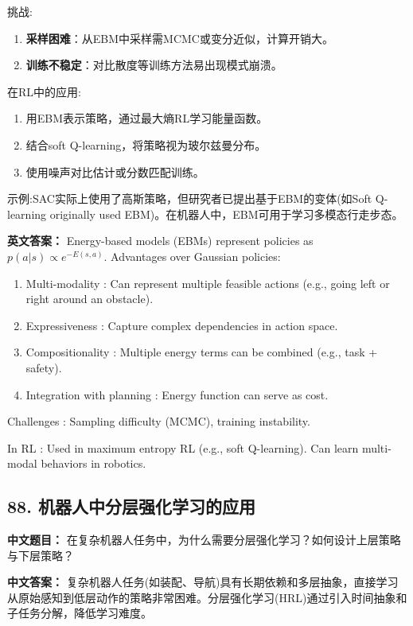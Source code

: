 \documentclass[10pt,a4paper]{ctexart}
\begin{document}
 挑战:
\begin{enumerate}
    \item \textbf{采样困难}：从EBM中采样需MCMC或变分近似，计算开销大。
    \item \textbf{训练不稳定}：对比散度等训练方法易出现模式崩溃。
\end{enumerate}

 在RL中的应用:
\begin{enumerate}
    \item 用EBM表示策略，通过最大熵RL学习能量函数。
    \item 结合soft Q-learning，将策略视为玻尔兹曼分布。
    \item 使用噪声对比估计或分数匹配训练。
\end{enumerate}

 示例:SAC实际上使用了高斯策略，但研究者已提出基于EBM的变体(如Soft Q-learning originally used EBM)。在机器人中，EBM可用于学习多模态行走步态。

\textbf{英文答案：}  
Energy-based models (EBMs) represent policies as \(p(a|s) \propto e^{-E(s,a)}\). Advantages over Gaussian policies:
\begin{enumerate}
    \item Multi-modality : Can represent multiple feasible actions (e.g., going left or right around an obstacle).
    \item Expressiveness : Capture complex dependencies in action space.
    \item Compositionality : Multiple energy terms can be combined (e.g., task + safety).
    \item Integration with planning : Energy function can serve as cost.
\end{enumerate}

 Challenges : Sampling difficulty (MCMC), training instability.

 In RL : Used in maximum entropy RL (e.g., soft Q-learning). Can learn multi-modal behaviors in robotics.

\subsection*{88. 机器人中分层强化学习的应用}
\textbf{中文题目：} 在复杂机器人任务中，为什么需要分层强化学习？如何设计上层策略与下层策略？

\textbf{中文答案：}  
复杂机器人任务(如装配、导航)具有长期依赖和多层抽象，直接学习从原始感知到低层动作的策略非常困难。分层强化学习(HRL)通过引入时间抽象和子任务分解，降低学习难度。
\end{document}
